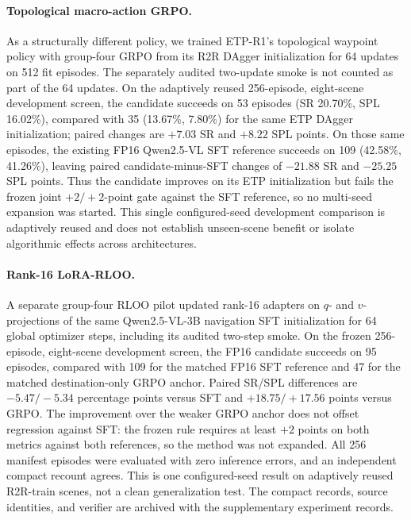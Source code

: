 \documentclass[10pt,twocolumn,letterpaper]{article}
\begin{document}
\paragraph{Topological macro-action GRPO.} As a structurally different
policy, we trained ETP-R1's topological waypoint policy with group-four
GRPO from its R2R DAgger initialization for 64 updates on 512 fit episodes.
The separately audited two-update smoke is not counted as part of the 64
updates. On the adaptively reused 256-episode, eight-scene development
screen, the candidate succeeds on 53 episodes (SR 20.70\%, SPL 16.02\%),
compared with 35 (13.67\%, 7.80\%) for the same ETP DAgger initialization;
paired changes are $+7.03$ SR and $+8.22$ SPL points. On those same episodes,
the existing FP16 Qwen2.5-VL SFT reference succeeds on 109 (42.58\%,
41.26\%), leaving paired candidate-minus-SFT changes of $-21.88$ SR and
$-25.25$ SPL points. Thus the candidate improves on its ETP initialization
but fails the frozen joint $+2/+2$-point gate against the SFT reference, so
no multi-seed expansion was started. This single configured-seed development
comparison is adaptively reused and does not establish unseen-scene benefit
or isolate algorithmic effects across architectures.

\paragraph{Rank-16 LoRA-RLOO.} A separate group-four RLOO pilot updated
rank-16 adapters on $q$- and $v$-projections of the same Qwen2.5-VL-3B
navigation SFT initialization for 64 global optimizer steps, including its
audited two-step smoke. On the frozen 256-episode, eight-scene development
screen, the FP16 candidate succeeds on 95 episodes, compared with 109 for the
matched FP16 SFT reference and 47 for the matched destination-only GRPO
anchor. Paired SR/SPL differences are $-5.47/-5.34$ percentage points versus
SFT and $+18.75/+17.56$ points versus GRPO. The improvement over the weaker
GRPO anchor does not offset regression against SFT: the frozen rule requires
at least $+2$ points on both metrics against both references, so the method
was not expanded. All 256 manifest episodes were evaluated with zero
inference errors, and an independent compact recount agrees. This is one
configured-seed result on adaptively reused R2R-train scenes, not a clean
generalization test. The compact records, source identities, and verifier are
archived with the supplementary experiment records.
\end{document}
